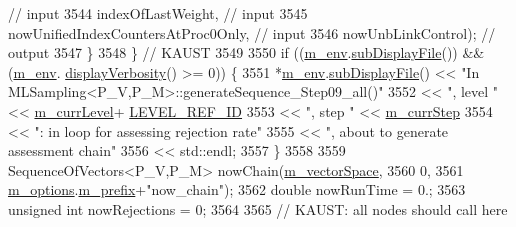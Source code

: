 \begin{DoxyCode}
{      // input}
3544                                           indexOfLastWeight,                  \textcolor{comment}{// input}
3545                                           nowUnifiedIndexCountersAtProc0Only, \textcolor{comment}{// input}
3546                                           nowUnbLinkControl);                 \textcolor{comment}{// output}
3547           \}
3548         \} \textcolor{comment}{// KAUST}
3549 
3550         \textcolor{keywordflow}{if} ((\hyperlink{class_q_u_e_s_o_1_1_m_l_sampling_a13f1ca4fe9f94822fe572a743eaced1d}{m\_env}.\hyperlink{class_q_u_e_s_o_1_1_base_environment_a8a0064746ae8dddfece4229b9ad374d6}{subDisplayFile}()) && (\hyperlink{class_q_u_e_s_o_1_1_m_l_sampling_a13f1ca4fe9f94822fe572a743eaced1d}{m\_env}.
      \hyperlink{class_q_u_e_s_o_1_1_base_environment_a1fe5f244fc0316a0ab3e37463f108b96}{displayVerbosity}() >= 0)) \{
3551           *\hyperlink{class_q_u_e_s_o_1_1_m_l_sampling_a13f1ca4fe9f94822fe572a743eaced1d}{m\_env}.\hyperlink{class_q_u_e_s_o_1_1_base_environment_a8a0064746ae8dddfece4229b9ad374d6}{subDisplayFile}() << \textcolor{stringliteral}{"In
       MLSampling<P\_V,P\_M>::generateSequence\_Step09\_all()"}
3552                                   << \textcolor{stringliteral}{", level "} << \hyperlink{class_q_u_e_s_o_1_1_m_l_sampling_af9416874c856e50f3b35270e801f17e4}{m\_currLevel}+
      \hyperlink{_m_l_sampling_level_options_8h_a68d15eaf394d210effcf584b938206d3}{LEVEL\_REF\_ID}
3553                                   << \textcolor{stringliteral}{", step "}  << \hyperlink{class_q_u_e_s_o_1_1_m_l_sampling_a1b1f8ccb4823bdfa26ec652f0807c63e}{m\_currStep}
3554                                   << \textcolor{stringliteral}{": in loop for assessing rejection rate"}
3555                                   << \textcolor{stringliteral}{", about to generate assessment chain"}
3556                                   << std::endl;
3557         \}
3558 
3559         SequenceOfVectors<P\_V,P\_M> nowChain(\hyperlink{class_q_u_e_s_o_1_1_m_l_sampling_a7bc4c72f65ba9166ed94a6e198b0915b}{m\_vectorSpace},
3560                                                    0,
3561                                                    \hyperlink{class_q_u_e_s_o_1_1_m_l_sampling_af8504cc57ec72b3c52833826b2bfff8e}{m\_options}.\hyperlink{class_q_u_e_s_o_1_1_m_l_sampling_options_a1d3d48598e0b59b46337ce66a52671a5}{m\_prefix}+\textcolor{stringliteral}{"now\_chain"});
3562         \textcolor{keywordtype}{double}       nowRunTime    = 0.;
3563         \textcolor{keywordtype}{unsigned} \textcolor{keywordtype}{int} nowRejections = 0;
3564 
3565         \textcolor{comment}{// KAUST: all nodes should call here}

\end{DoxyCode}
